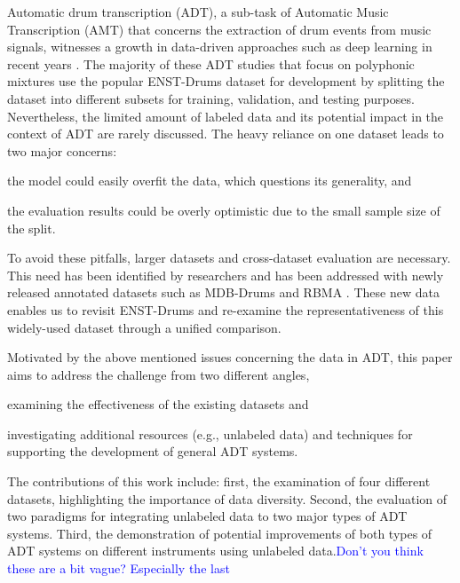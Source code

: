 \documentclass{article}
\newcommand{\comment}[1]{{\textcolor{blue}{#1}}}
\begin{document}
Automatic drum transcription (ADT), a sub-task of Automatic Music Transcription (AMT) \cite{Benetos2013} that concerns the extraction of drum events from music signals, witnesses a growth in data-driven approaches such as deep learning in recent years \cite{Vogl2016, Southall2016, Vogl2017_icassp, Southall2017, Vogl2017_ismir}. The majority of these ADT studies that focus on polyphonic mixtures use the popular ENST-Drums dataset \cite{Gillet2006_enst} for development by splitting the dataset into different subsets for training, validation, and testing purposes. Nevertheless, the limited amount of labeled data and its potential impact in the context of ADT are rarely discussed. 
The heavy reliance on one dataset leads to two major concerns: 
\begin{inparaenum}[(i)]
	\item   the model could easily overfit the data, which questions its generality, and
    \item   the evaluation results could be overly optimistic due to the small sample size of the split. 
\end{inparaenum} 
To avoid these pitfalls, larger datasets and cross-dataset evaluation are necessary. This need has been identified by researchers and has been addressed with newly released annotated datasets such as MDB-Drums \cite{Southall2017_mdb} and RBMA \cite{Vogl2017_ismir}. These new data enables us to revisit ENST-Drums and re-examine the representativeness of this widely-used dataset through a unified comparison. 

Motivated by the above mentioned issues concerning the data in ADT, this paper aims to address the challenge from two different angles,
\begin{inparaenum}[(i)]
	\item examining the effectiveness of the existing datasets and
	\item investigating additional resources (e.g., unlabeled data) and techniques for supporting the development of general ADT systems.
\end{inparaenum} 
The contributions of this work include: first, the examination of four different datasets, highlighting the importance of data diversity. Second, the evaluation of two paradigms for integrating unlabeled data to two major types of ADT systems. Third, the demonstration of potential improvements of both types of ADT systems on different instruments using unlabeled data.\comment{Don't you think these are a bit vague? Especially the last}
\end{document}
